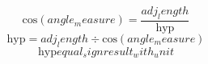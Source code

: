\[\text{{cos}}({angle_measure})=\frac{{{adj_length}}}{{\text{{{hyp}}}}}\]
\[\text{{{hyp}}}={adj_length}\div \text{{cos}}({angle_measure})\]
\[\text{{{hyp}}}{equal_sign}{result_with_unit}\]
